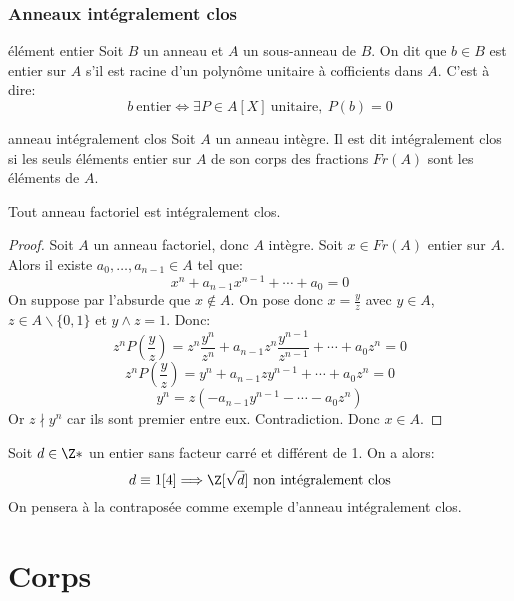 \subsubsection{Anneaux intégralement clos}

\begin{definition}{élément entier}{}
    Soit $B$ un anneau et $A$ un sous-anneau de $B$. On dit que $b \in B$ est entier sur $A$ s'il est racine d'un polynôme unitaire à cofficients dans $A$.
    C'est à dire:
    \[ b ~ \text{entier} \Longleftrightarrow \exists P \in A[X] ~ \text{unitaire}, ~ P(b) = 0 \]
\end{definition}

\begin{proposition}{anneau intégralement clos}{}
    Soit $A$ un anneau intègre. Il est dit intégralement clos si les seuls éléments entier sur $A$ de son corps des fractions $Fr(A)$ sont les éléments de $A$.
\end{proposition}

\begin{proposition}{}{}
    Tout anneau factoriel est intégralement clos.
\end{proposition}

\begin{proof}
    Soit $A$ un anneau factoriel, donc $A$ intègre. \newline
    Soit $x \in Fr(A)$ entier sur $A$. Alors il existe $a_0, \dots, a_{n-1} \in A$ tel que: 
    \[x^n + a_{n-1}x^{n-1} + \cdots + a_0 = 0\]
    On suppose par l'absurde que $x \notin A$. \newline
    On pose donc $x = \frac{y}{z}$ avec $y \in A$, $z \in A \backslash \{0,1\}$ et $y \wedge z = 1$.
    Donc:
    \[ z^n P(\frac{y}{z}) = z^n \frac{y^n}{z^n} + a_{n-1} z^n \frac{y^{n-1}}{z^{n-1}} + \cdots + a_0 z^n = 0 \]
    \[ z^n P(\frac{y}{z}) = y^n + a_{n-1} z y^{n-1} + \cdots + a_0 z^n = 0\]
    \[ y^n = z (- a_{n-1} y^{n-1} - \cdots - a_0 z^n) \]
    Or $z \nmid y^n$ car ils sont premier entre eux. Contradiction. Donc $x \in A$.
\end{proof}

\begin{example}{}{}
    Soit $d \in \Z*$ un entier sans facteur carré et différent de 1. On a alors:
    \[ d \equiv 1 [4] \Longrightarrow \Z[\sqrt{d}] ~ \text{non intégralement clos} \]
    On pensera à la contraposée comme exemple d'anneau intégralement clos.
\end{example}



\newpage

\section{Corps}

\subsection{}